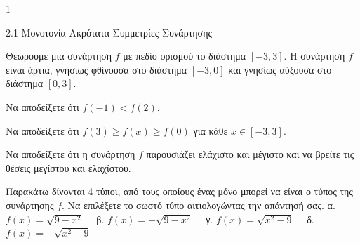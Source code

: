 \begin{ylh}{1}
\item 2.1 Μονοτονία-Ακρότατα-Συμμετρίες Συνάρτησης
\end{ylh}
Θεωρούμε μια συνάρτηση $f$ με πεδίο ορισμού το διάστημα $[-3, 3]$. Η συνάρτηση $f$ είναι άρτια, γνησίως φθίνουσα στο διάστημα $[-3, 0]$ και γνησίως αύξουσα στο διάστημα $[0, 3]$.
\begin{alist}
\item Να αποδείξετε ότι $f(-1) < f(2)$.
\item Να αποδείξετε ότι $f(3) \ge f(x) \ge f(0)$ για κάθε $x \in [-3, 3]$.
\item Να αποδείξετε ότι η συνάρτηση $f$ παρουσιάζει ελάχιστο και μέγιστο και να βρείτε τις θέσεις μεγίστου και ελαχίστου.
\item Παρακάτω δίνονται 4 τύποι, από τους οποίους ένας μόνο μπορεί να είναι ο τύπος της συνάρτησης $f$. Να επιλέξετε το σωστό τύπο αιτιολογώντας την απάντησή σας.
α. $f(x) = \sqrt{9 - x^2} \quad$ β. $f(x) = -\sqrt{9 - x^2} \quad$ γ. $f(x) = \sqrt{x^2 - 9} \quad$ δ. $f(x) = -\sqrt{x^2 - 9}$
\end{alist}

